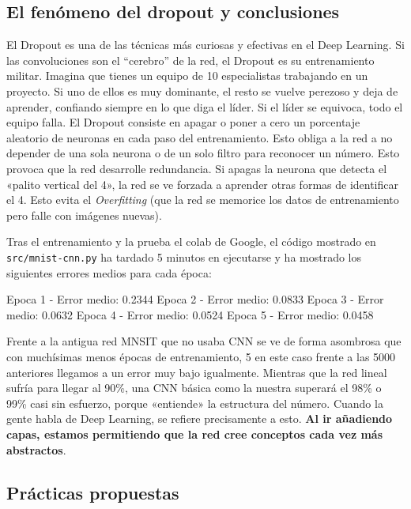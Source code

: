 \documentclass[a4paper,11pt]{article}
\begin{document}
\subsection{El fenómeno del dropout y conclusiones}

El Dropout es una de las técnicas más curiosas y efectivas en el Deep
Learning. Si las convoluciones son el ``cerebro'' de la red, el Dropout es su
entrenamiento militar. Imagina que tienes un equipo de 10 especialistas
trabajando en un proyecto. Si uno de ellos es muy dominante, el resto se vuelve
perezoso y deja de aprender, confiando siempre en lo que diga el líder. Si el
líder se equivoca, todo el equipo falla. El Dropout consiste en apagar o poner a
cero un porcentaje aleatorio de neuronas en cada paso del entrenamiento. Esto
obliga a la red a no depender de una sola neurona o de un solo filtro para
reconocer un número. Esto provoca que la red desarrolle redundancia. Si apagas
la neurona que detecta el «palito vertical del 4», la red se ve forzada a
aprender otras formas de identificar el 4. Esto evita el \emph{Overfitting} (que
la red se memorice los datos de entrenamiento pero falle con imágenes nuevas).

Tras el entrenamiento y la prueba el colab de Google, el código mostrado
en \texttt{src/mnist-cnn.py} ha tardado 5 minutos en ejecutarse y ha
mostrado los siguientes errores medios para cada época:

\begin{codigo}
Epoca 1 - Error medio: 0.2344
Epoca 2 - Error medio: 0.0833
Epoca 3 - Error medio: 0.0632
Epoca 4 - Error medio: 0.0524
Epoca 5 - Error medio: 0.0458
\end{codigo}

Frente a la antigua red MNSIT que no usaba CNN se ve de forma asombrosa
que con muchísimas menos épocas de entrenamiento, 5 en este caso frente
a las 5000 anteriores llegamos a un error muy bajo igualmente. Mientras
que la red lineal sufría para llegar al 90\%, una CNN básica como la
nuestra superará el 98\% o 99\% casi sin esfuerzo, porque «entiende» la
estructura del número. Cuando la gente habla de Deep Learning, se
refiere precisamente a esto. \textbf{Al ir añadiendo capas, estamos
permitiendo que la red cree conceptos cada vez más abstractos}.



\subsection{Prácticas propuestas}
\end{document}
